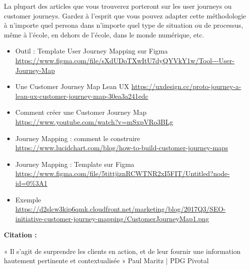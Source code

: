 La plupart des articles que vous trouverez porteront sur les user journeys ou customer journeys. Gardez à l'esprit que vous pouvez adapter cette méthodologie à n'importe quel persona dans n'importe quel type de situation ou de processus, même à l'école, en dehors de l'école, dans le monde numérique, etc.

\begin{itemize}
\item Outil : Template User Journey Mapping sur Figma \url{https://www.figma.com/file/sXdUDoTXwItU7dyQYVkY1w/Tool---User-Journey-Map}
\item Une Customer Journey Map Lean UX \url{https://uxdesign.cc/proto-journey-a-lean-ux-customer-journey-map-30ea3a241edc}
\item Comment créer une Customer Journey Map \url{https://www.youtube.com/watch?v=mSxpVRo3BLg}
\item Journey Mapping : comment le construire \url{https://www.lucidchart.com/blog/how-to-build-customer-journey-maps}
\item Journey Mapping : Template sur Figma \url{https://www.figma.com/file/5tittjiznRCWTNR2xI5FIT/Untitled?node-id=0%3A1}
\item Exemple \url{https://d2slcw3kip6qmk.cloudfront.net/marketing/blog/2017Q3/SEO-initiative-customer-journey-mapping/CustomerJourneyMap1.png}
\end{itemize}

\textbf{Citation :}

« Il s'agit de surprendre les clients en action, et de leur fournir une information hautement pertinente et contextualisée » Paul Maritz | PDG Pivotal

